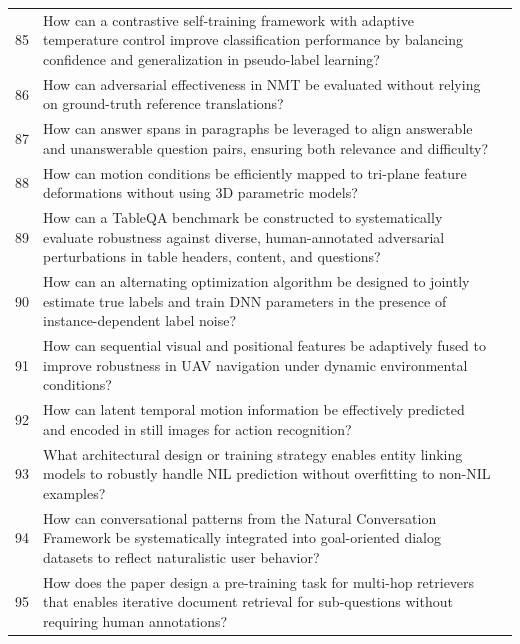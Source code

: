 \begin{longtable}{p{0.8cm}p{9cm}p{2.5cm}}
85 & How can a contrastive self-training framework with adaptive temperature control improve classification performance by balancing confidence and generalization in pseudo-label learning? & \cite{10.18653/v1/2024.eacl-long.39} \\
86 & How can adversarial effectiveness in NMT be evaluated without relying on ground-truth reference translations? & \cite{10.18653/v1/2021.acl-long.153} \\
87 & How can answer spans in paragraphs be leveraged to align answerable and unanswerable question pairs, ensuring both relevance and difficulty? & \cite{10.18653/v1/n19-1415} \\
88 & How can motion conditions be efficiently mapped to tri-plane feature deformations without using 3D parametric models? & \cite{10.1609/aaai.v38i7.28473} \\
89 & How can a TableQA benchmark be constructed to systematically evaluate robustness against diverse, human-annotated adversarial perturbations in table headers, content, and questions? & \cite{10.18653/v1/2023.acl-long.334} \\
90 & How can an alternating optimization algorithm be designed to jointly estimate true labels and train DNN parameters in the presence of instance-dependent label noise? & \cite{10.1609/aaai.v35i11.17221} \\
91 & How can sequential visual and positional features be adaptively fused to improve robustness in UAV navigation under dynamic environmental conditions? & \cite{10.1609/aaai.v38i9.28906} \\
92 & How can latent temporal motion information be effectively predicted and encoded in still images for action recognition? & \cite{10.1609/aaai.v34i03.5653} \\
93 & What architectural design or training strategy enables entity linking models to robustly handle NIL prediction without overfitting to non-NIL examples? & \cite{10.18653/v1/2023.findings-acl.690} \\
94 & How can conversational patterns from the Natural Conversation Framework be systematically integrated into goal-oriented dialog datasets to reflect naturalistic user behavior? & \cite{10.18653/v1/2020.findings-emnlp.358} \\
95 & How does the paper design a pre-training task for multi-hop retrievers that enables iterative document retrieval for sub-questions without requiring human annotations? & \cite{10.18653/v1/2021.findings-acl.62} \\

\end{longtable}
